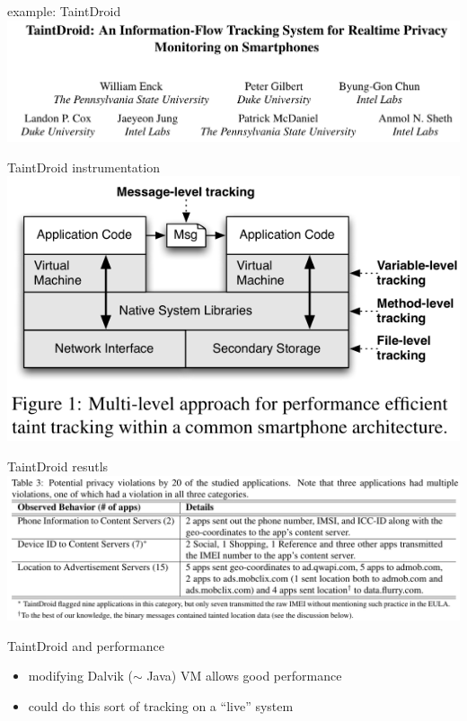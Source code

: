 \begin{frame}{example: TaintDroid}
\includegraphics[width=\textwidth]{../taint/taintdroid}
\end{frame}

\begin{frame}{TaintDroid instrumentation}
\includegraphics[height=0.9\textheight]{../taint/taintdroid-fig1}
\end{frame}

\begin{frame}{TaintDroid resutls}
\includegraphics[width=\textwidth]{../taint/taintdroid-tbl3}
\end{frame}

\begin{frame}{TaintDroid and performance}
    \begin{itemize}
    \item modifying Dalvik ($\sim$ Java) VM allows good performance
    \item could do this sort of tracking on a ``live'' system
    \end{itemize}
\end{frame}
